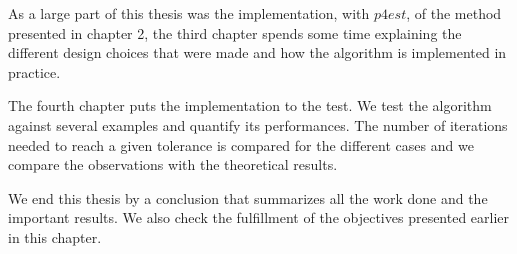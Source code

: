 As a large part of this thesis was the implementation, with $p4est$, of the method presented in chapter 2, the third chapter spends some time explaining the different design choices that were made and how the algorithm is implemented in practice. 

The fourth chapter puts the implementation to the test. We test the algorithm against several examples and quantify its performances. The number of iterations needed to reach a given tolerance is compared for the different cases and we compare the observations with the theoretical results. 

We end this thesis by a conclusion that summarizes all the work done and the important results. We also check the fulfillment of the objectives presented earlier in this chapter.


















